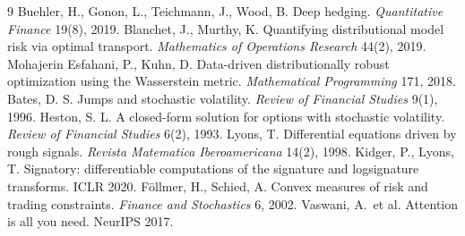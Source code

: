 \documentclass[11pt,a4paper]{article}
\begin{document}
\begin{thebibliography}{9}
 Buehler, H., Gonon, L., Teichmann, J., Wood, B.
  Deep hedging. \emph{Quantitative Finance} 19(8), 2019.
 Blanchet, J., Murthy, K.
  Quantifying distributional model risk via optimal transport.
  \emph{Mathematics of Operations Research} 44(2), 2019.
 Mohajerin Esfahani, P., Kuhn, D.
  Data-driven distributionally robust optimization using the Wasserstein
  metric. \emph{Mathematical Programming} 171, 2018.
 Bates, D. S. Jumps and stochastic volatility.
  \emph{Review of Financial Studies} 9(1), 1996.
 Heston, S. L. A closed-form solution for options with
  stochastic volatility. \emph{Review of Financial Studies} 6(2), 1993.
 Lyons, T. Differential equations driven by rough
  signals. \emph{Revista Matematica Iberoamericana} 14(2), 1998.
 Kidger, P., Lyons, T. Signatory: differentiable
  computations of the signature and logsignature transforms. ICLR 2020.
 F\"ollmer, H., Schied, A. Convex measures of
  risk and trading constraints. \emph{Finance and Stochastics} 6, 2002.
 Vaswani, A.\ et al. Attention is all you need. NeurIPS 2017.
\end{thebibliography}
\end{document}
